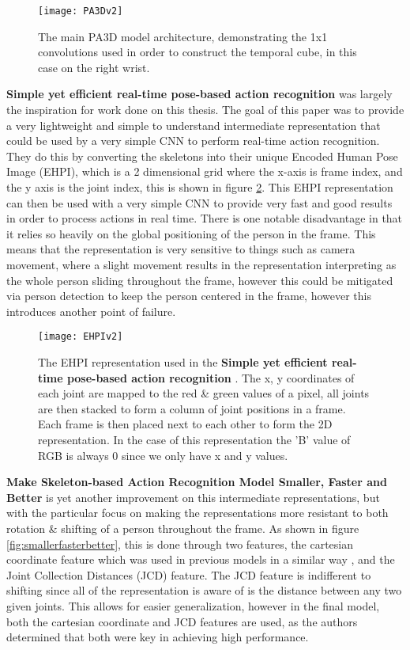 \begin{figure}[ht]
	\texttt{[image: PA3Dv2]}
	\centering
	\caption{The main PA3D \cite{PA3D} model architecture, demonstrating the 1x1 convolutions used in order to construct the temporal cube, in this case on the right wrist.}
	\label{fig:PA3D}
\end{figure}

\textbf{Simple yet efficient real-time pose-based action recognition} \cite{simple_yet_efficient} was largely the inspiration for work done on this thesis. The goal of this paper was to provide a very lightweight and simple to understand intermediate representation that could be used by a very simple CNN to perform real-time action recognition. They do this by converting the skeletons into their unique Encoded Human Pose Image (EHPI), which is a 2 dimensional grid where the x-axis is frame index, and the y axis is the joint index, this is shown in figure \ref{fig:EHPI}. This EHPI representation can then be used with a very simple CNN to provide very fast and good results in order to process actions in real time. There is one notable disadvantage in that it relies so heavily on the global positioning of the person in the frame. This means that the representation is very sensitive to things such as camera movement, where a slight movement results in the representation interpreting as the whole person sliding throughout the frame, however this could be mitigated via person detection to keep the person centered in the frame, however this introduces another point of failure.

\begin{figure}[ht]
	\texttt{[image: EHPIv2]}
	\centering
	\caption{The EHPI representation used in the \textbf{Simple yet efficient real-time pose-based action recognition} \cite{simple_yet_efficient}. The x, y coordinates of each joint are mapped to the red \& green values of a pixel, all joints are then stacked to form a column of joint positions in a frame. Each frame is then placed next to each other to form the 2D representation. In the case of this representation the 'B' value of RGB is always 0 since we only have x and y values.}
	\label{fig:EHPI}
\end{figure}

\textbf{Make Skeleton-based Action Recognition Model Smaller, Faster and Better} \cite{smaller_faster_better} is yet another improvement on this intermediate representations, but with the particular focus on making the representations more resistant to both rotation \& shifting of a person throughout the frame.  As shown in figure \ref{fig:smallerfasterbetter}, this is done through two features, the cartesian coordinate feature which was used in previous models in a similar way \cite{simple_yet_efficient}, and the Joint Collection Distances (JCD) feature. The JCD feature is indifferent to shifting since all of the representation is aware of is the distance between any two given joints. This allows for easier generalization, however in the final model, both the cartesian coordinate and JCD features are used, as the authors determined that both were key in achieving high performance.

